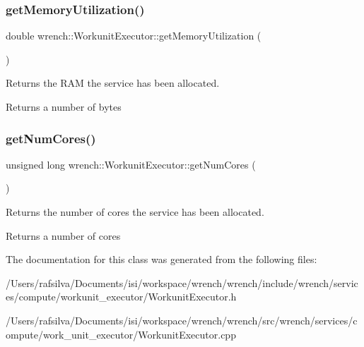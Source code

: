 \subsubsection{\texorpdfstring{get\+Memory\+Utilization()}{getMemoryUtilization()}}
{\footnotesize\ttfamily double wrench\+::\+Workunit\+Executor\+::get\+Memory\+Utilization (\begin{DoxyParamCaption}{ }\end{DoxyParamCaption})}



Returns the R\+AM the service has been allocated. 

\begin{DoxyReturn}{Returns}
a number of bytes 
\end{DoxyReturn}
\mbox{\label{classwrench_1_1_workunit_executor_ad2062b2e147a0a511fbdd553688efde8}} 
\subsubsection{\texorpdfstring{get\+Num\+Cores()}{getNumCores()}}
{\footnotesize\ttfamily unsigned long wrench\+::\+Workunit\+Executor\+::get\+Num\+Cores (\begin{DoxyParamCaption}{ }\end{DoxyParamCaption})}



Returns the number of cores the service has been allocated. 

\begin{DoxyReturn}{Returns}
a number of cores 
\end{DoxyReturn}


The documentation for this class was generated from the following files\+:\begin{DoxyCompactItemize}
\item 
/\+Users/rafsilva/\+Documents/isi/workspace/wrench/wrench/include/wrench/services/compute/workunit\+\_\+executor/Workunit\+Executor.\+h\item 
/\+Users/rafsilva/\+Documents/isi/workspace/wrench/wrench/src/wrench/services/compute/work\+\_\+unit\+\_\+executor/Workunit\+Executor.\+cpp\end{DoxyCompactItemize}
